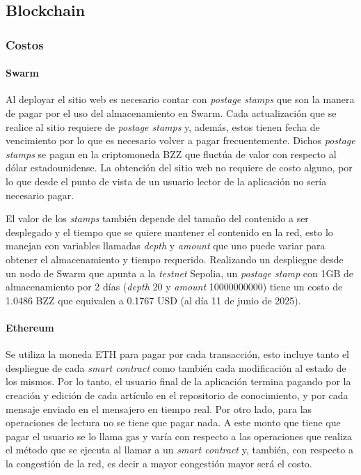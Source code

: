 \subsection{Blockchain}

\subsubsection{Costos}

\paragraph{Swarm}
Al deployar el sitio web es necesario contar con \textit{postage stamps} que son la manera de pagar por el uso del almacenamiento en Swarm. Cada actualización que se realice al sitio requiere de \textit{postage stamps} y, además, estos tienen fecha de vencimiento por lo que es necesario volver a pagar frecuentemente. Dichos \textit{postage stamps} se pagan en la criptomoneda BZZ que fluctúa de valor con respecto al dólar estadounidense. La obtención del sitio web no requiere de costo alguno, por lo que desde el punto de vista de un usuario lector de la aplicación no sería necesario pagar.

El valor de los \textit{stamps} también depende del tamaño del contenido a ser desplegado y el tiempo que se quiere mantener el contenido en la red, esto lo manejan con variables llamadas \textit{depth} y \textit{amount} que uno puede variar para obtener el almacenamiento y tiempo requerido. Realizando un despliegue desde un nodo de Swarm que apunta a la \textit{testnet} Sepolia, un \textit{postage stamp} con 1GB de almacenamiento por 2 días (\textit{depth} 20 y \textit{amount} 10000000000) tiene un costo de 1.0486 BZZ que equivalen a 0.1767 USD (al día 11 de junio de 2025).

\paragraph{Ethereum}
Se utiliza la moneda ETH para pagar por cada transacción, esto incluye tanto el despliegue de cada \textit{smart contract} como también cada modificación al estado de los mismos. Por lo tanto, el usuario final de la aplicación termina pagando por la creación y edición de cada artículo en el repositorio de conocimiento, y por cada mensaje enviado en el mensajero en tiempo real. Por otro lado, para las operaciones de lectura no se tiene que pagar nada. A este monto que tiene que pagar el usuario se lo llama gas y varía con respecto a las operaciones que realiza el método que se ejecuta al llamar a un \textit{smart contract} y, también, con respecto a la congestión de la red, es decir a mayor congestión mayor será el costo.

